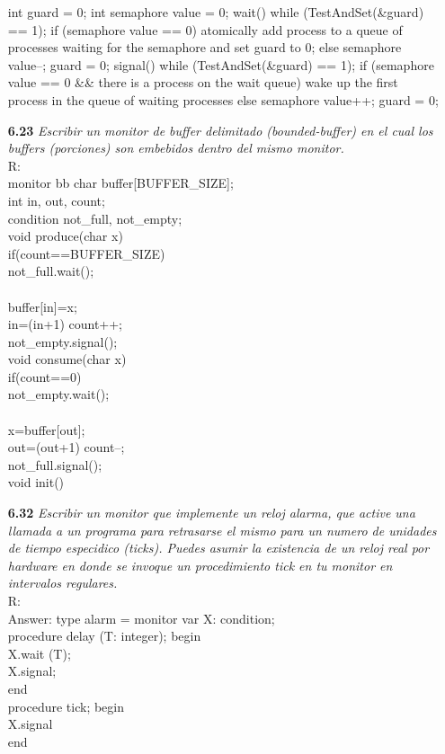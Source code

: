 \begin{itemize}
int guard = 0;
int semaphore value = 0;
wait(){
	 while (TestAndSet(\&guard) == 1);
	if (semaphore value == 0){
		atomically add process to a queue of processes
		waiting for the semaphore and set guard to 0;
		} 
	else{
		semaphore value--;
		guard = 0;
	}
}
signal(){
	while (TestAndSet(\&guard) == 1);
	if (semaphore value == 0 \&\& there is a process on the wait queue)
		wake up the first process in the queue
		of waiting processes
	else
		semaphore value++;
		guard = 0;
	}


\item[\textbf{6.23}]\emph {Escribir un monitor de buffer delimitado (bounded-buffer) en el cual los buffers (porciones) son embebidos dentro del mismo monitor.}\\
R:\\
monitor bb{
	char buffer[BUFFER\_SIZE];\\
	int in, out, count;\\
	condition not\_full, not\_empty;\\
	void produce(char x){\\
		if(count==BUFFER\_SIZE){\\
			not\_full.wait();\\
		}\\
		buffer[in]=x;\\
		in=(in+1)%
		count++;\\
		not\_empty.signal();\\
		}	
	void consume(char x){\\
		if(count==0){\\
			not\_empty.wait();\\
			}\\
		x=buffer[out];\\
		out=(out+1)%
		count--;\\
		not\_full.signal();\\
	}
}
void init() 

\item[\textbf{6.32}]\emph {Escribir un monitor que implemente un reloj alarma, que active una llamada a un programa para retrasarse el mismo para un numero de unidades de tiempo especidico (ticks). Puedes asumir la existencia de un reloj real por hardware en donde se invoque un procedimiento tick en tu monitor en intervalos regulares.}\\
R:\\
Answer: type alarm = monitor var X: condition;\\
procedure delay (T: integer); begin\\
X.wait (T);\\
X.signal;\\
end\\
procedure tick; begin\\
X.signal\\
end

\end{itemize}

